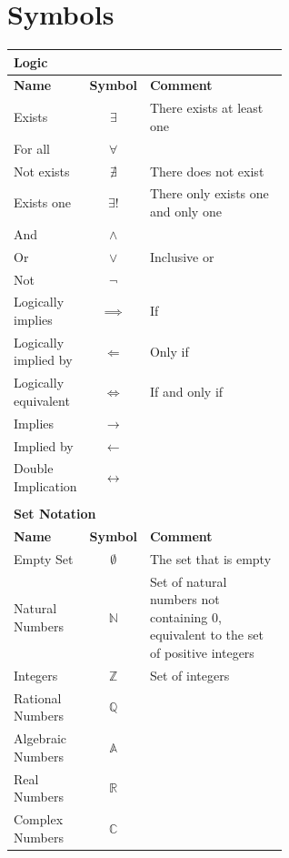 \documentclass[12pt, english]{book}
\begin{document}
	\section*{Symbols}
	\begin{tabularx}{\textwidth}{ l c p{0.6\linewidth}}
		\multicolumn{3}{l}{\textbf{{\large Logic}}} \\ [10pt]
		\hline
		\textbf{Name} & \textbf{Symbol} & \textbf{Comment} \\
		\hline
		Exists 					& $\exists$ 		& There exists at least one\\
		For all 				& $\forall$ 		& \\
		Not exists 				& $\nexists$ 		& There does not exist\\ 
		Exists one				& $\exists!$ 		& There only exists one and only one \\
		And 					& $\land$			& \\
		Or						& $\lor$			& Inclusive or \\
		Not 					& $\neg$			& \\
		Logically implies 		& $\implies$ 		& If \\
		Logically implied by 	& $\Longleftarrow$ 	& Only if \\  
		Logically equivalent 	& $\iff$ 			& If and only if \\
		Implies 				& $\longrightarrow$	& \\
		Implied by 				& $\longleftarrow$ 	& \\  
		Double Implication 		& $\longleftrightarrow$	& \\
		\hline	
		
		& & \\
		\multicolumn{3}{l}{\textbf{{\large Set Notation}}} \\ [10pt]
		\hline
		\textbf{Name} & \textbf{Symbol} & \textbf{Comment} \\
		\hline
 		Empty Set 				& $\emptyset$ 		& The set that is empty \\
 		Natural Numbers 		& $\mathbb{N}$		& Set of natural numbers not containing 0, equivalent to the set of positive integers \\
 		Integers 				& $\mathbb{Z}$		& Set of integers \\
 		Rational Numbers 		& $\mathbb{Q}$		& \\
 		Algebraic Numbers		& $\mathbb{A}$		& \\
 		Real Numbers 			& $\mathbb{R}$		& \\
 		Complex Numbers 		& $\mathbb{C}$		& \\
 		

\end{tabularx}
\end{document}
